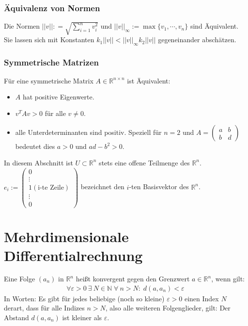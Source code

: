 \subsubsection*{Äquivalenz von Normen}
 Die Normen $||v||: = \sqrt{\sum_{i = 1}^n v_i^2}$ und $||v||_{\infty}:= \max \{ v_1, \cdots, v_n \} $ sind Äquivalent. Sie lassen sich  mit Konstanten $k_1 ||v|| < ||v||_{\infty} k_2  ||v|| $ gegeneinander abschätzen.

\subsubsection*{Symmetrische Matrizen}
 Für eine symmetrische Matrix $A \in \mathbb{R}^{n \times n}$ ist Äquivalent:
\begin{itemize}
\item $A$ hat positive Eigenwerte.
\item $v^TA v > 0$ für alle $v \neq 0$.
\item alle Unterdeterminanten sind positiv. Speziell für $n=2$ und $A = \begin{pmatrix} a & b \\ b & d\end{pmatrix}$ bedeutet dies
$a >0$ und $ad -b^2 >0$. 
\end{itemize}

\begin{Definition}[Konventionen]
In diesem Abschnitt ist $U \subset \mathbb{R}^n$ stets eine offene Teilmenge des $\mathbb{R}^n$.
 $e_i := \begin{pmatrix}  0 \\  \vdots \\ 1  (\text{i-te Zeile})\\ \vdots \\ 0 \end{pmatrix}$  bezeichnet den $i$-ten Basisvektor des $\mathbb{R}^n$.

\end{Definition}

\section{Mehrdimensionale Differentialrechnung}

\begin{Definition}[Konvergenz]
 Eine Folge $(a_n)$ in $\mathbb{R}^n$ heißt konvergent gegen den Grenzwert $a \in \mathbb{R}^n$, wenn gilt:
\begin{align*}
\forall {\varepsilon > 0} \ \exists \ N \in \mathbb{N} \; \forall \ n > N: \; d(a, a_n) < \varepsilon\,
\end{align*}
In Worten: Es gibt für jedes beliebige (noch so kleine) $\varepsilon > 0$ einen Index $N$ derart, dass für alle Indizes $n > N$, also alle weiteren Folgenglieder, gilt: Der Abstand $d(a, a_n)$ ist kleiner als $\varepsilon$.
\end{Definition}

